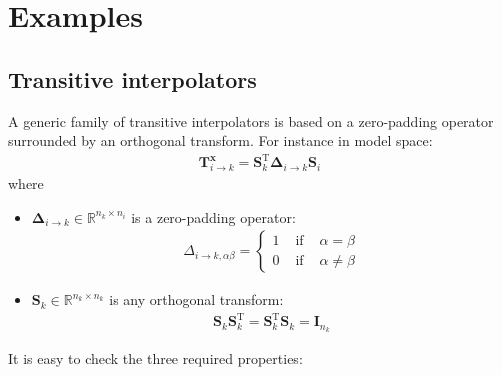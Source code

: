 \documentclass[12pt]{scrartcl}
\begin{document}
\section{Examples}

\subsection{Transitive interpolators}
A generic family of transitive interpolators is based on a zero-padding operator surrounded by an orthogonal transform. For instance in model space:
\begin{align}
\mathbf{T}^\mathbf{x}_{i \rightarrow k} = \mathbf{S}^\mathrm{T}_k \boldsymbol{\Delta}_{i \rightarrow k} \mathbf{S}_i
\end{align}
where
\begin{itemize}
\item $\boldsymbol{\Delta}_{i \rightarrow k} \in \mathbb{R}^{n_k \times n_i}$ is a zero-padding operator:
\begin{align}
\Delta_{i \rightarrow k, \alpha \beta} = \left\{
\begin{array}{ccc}
1 & \text{ if } & \alpha = \beta \\
0 & \text{ if } & \alpha \ne \beta
\end{array}\right.
\end{align}
\item $\mathbf{S}_k \in \mathbb{R}^{n_k \times n_k}$ is any orthogonal transform:
\begin{align}
\mathbf{S}_k \mathbf{S}_k^\mathrm{T} = \mathbf{S}_k^\mathrm{T} \mathbf{S}_k = \mathbf{I}_{n_k}
\end{align}
\end{itemize}
It is easy to check the three required properties:
\end{document}
